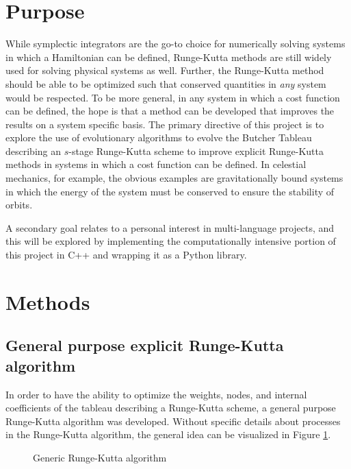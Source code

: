 \documentclass[onecolumn,titlepage,letterpaper,10pt]{article}
\begin{document}
\section{Purpose}
While symplectic integrators are the go-to choice for numerically solving
systems in which a Hamiltonian can be defined, Runge-Kutta methods are still
widely used for solving physical systems as well.
Further, the Runge-Kutta method should be able to be optimized such that conserved
quantities in \textit{any} system would be respected. To be more general, in any
system in which a cost function can be defined, the hope is that a method can be
developed that improves the results on a system specific basis.
The primary directive of this project is to explore the use of evolutionary
algorithms to evolve the Butcher Tableau describing an $s$-stage Runge-Kutta
scheme to improve explicit Runge-Kutta methods
in systems in which a cost function can be defined.
In celestial mechanics, for example, the obvious examples are gravitationally bound systems in
which the energy of the system must be conserved to ensure the stability of
orbits.

A secondary goal relates to
a personal interest in multi-language projects, and this will be explored by
implementing the computationally intensive portion of this project in C++ and
wrapping it as a Python library.

\section{Methods}
\subsection{General purpose explicit Runge-Kutta algorithm}
In order to have the ability to optimize the weights, nodes, and internal coefficients of
the tableau describing a Runge-Kutta scheme, a general purpose Runge-Kutta
algorithm was developed. Without specific details about processes in
the Runge-Kutta algorithm, the general idea can be visualized in Figure
\ref{fig: generic rk flowchart}.
\begin{figure}[h!]
    \centering
    \caption[Generic Runge-Kutta algorithm]{Generic Runge-Kutta algorithm}
    \label{fig: generic rk flowchart}
\end{figure}
\end{document}
